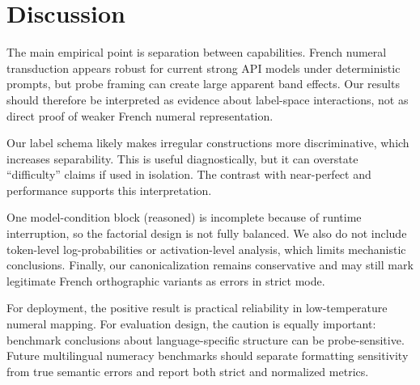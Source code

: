 \section{Discussion}
\label{sec:discussion}
The main empirical point is separation between capabilities. French numeral transduction appears robust for current strong API models under deterministic prompts, but probe framing can create large apparent band effects. Our \patterncls results should therefore be interpreted as evidence about label-space interactions, not as direct proof of weaker French numeral representation.

Our label schema likely makes irregular constructions more discriminative, which increases separability. This is useful diagnostically, but it can overstate ``difficulty'' claims if used in isolation. The contrast with near-perfect \digitword and \worddigit performance supports this interpretation.

One model-condition block (\gptfouronemini reasoned) is incomplete because of runtime interruption, so the factorial design is not fully balanced. We also do not include token-level log-probabilities or activation-level analysis, which limits mechanistic conclusions. Finally, our canonicalization remains conservative and may still mark legitimate French orthographic variants as errors in strict mode.

For deployment, the positive result is practical reliability in low-temperature numeral mapping. For evaluation design, the caution is equally important: benchmark conclusions about language-specific structure can be probe-sensitive. Future multilingual numeracy benchmarks should separate formatting sensitivity from true semantic errors and report both strict and normalized metrics.

